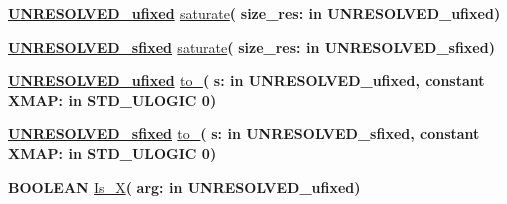 \begin{DoxyCompactItemize}
\item 
{\bfseries {\bfseries {\bfseries \hyperlink{classfixed__pkg_ae78bc2b36d22f6abeac163955e8a587d}{U\+N\+R\+E\+S\+O\+L\+V\+E\+D\+\_\+ufixed}} \textcolor{vhdlchar}{ }}} \hyperlink{classfixed__pkg_a5a4a80fca4ce1ae0ce0349f711403504}{saturate}{\bfseries  ( }{\bfseries \textcolor{vhdlchar}{size\+\_\+res\+: }\textcolor{stringliteral}{in }\textcolor{vhdlchar}{U\+N\+R\+E\+S\+O\+L\+V\+E\+D\+\_\+ufixed}}{\bfseries  )} 
\item 
{\bfseries {\bfseries {\bfseries \hyperlink{classfixed__pkg_aa723b28a027c3c0f9bca02d75e8df4d6}{U\+N\+R\+E\+S\+O\+L\+V\+E\+D\+\_\+sfixed}} \textcolor{vhdlchar}{ }}} \hyperlink{classfixed__pkg_a9fbb6432e98395eb6d27020bf82657f2}{saturate}{\bfseries  ( }{\bfseries \textcolor{vhdlchar}{size\+\_\+res\+: }\textcolor{stringliteral}{in }\textcolor{vhdlchar}{U\+N\+R\+E\+S\+O\+L\+V\+E\+D\+\_\+sfixed}}{\bfseries  )} 
\item 
{\bfseries {\bfseries {\bfseries \hyperlink{classfixed__pkg_ae78bc2b36d22f6abeac163955e8a587d}{U\+N\+R\+E\+S\+O\+L\+V\+E\+D\+\_\+ufixed}} \textcolor{vhdlchar}{ }}} \hyperlink{classfixed__pkg_a1a0ba551d5dae1edf3512dff88ca0d5d}{to\+\_}{\bfseries  ( }{\bfseries \textcolor{vhdlchar}{s\+: }\textcolor{stringliteral}{in }\textcolor{vhdlchar}{U\+N\+R\+E\+S\+O\+L\+V\+E\+D\+\_\+ufixed}}{\bfseries  , {\bfseries \textcolor{keywordflow}{constant}\textcolor{vhdlchar}{ }}\textcolor{vhdlchar}{X\+M\+A\+P\+: }\textcolor{stringliteral}{in }\textcolor{vhdlchar}{S\+T\+D\+\_\+\+U\+L\+O\+G\+I\+C   \textquotesingle{}0\textquotesingle{}}}{\bfseries  )} 
\item 
{\bfseries {\bfseries {\bfseries \hyperlink{classfixed__pkg_aa723b28a027c3c0f9bca02d75e8df4d6}{U\+N\+R\+E\+S\+O\+L\+V\+E\+D\+\_\+sfixed}} \textcolor{vhdlchar}{ }}} \hyperlink{classfixed__pkg_a54eb204a872904b05f02e464fc87b12b}{to\+\_}{\bfseries  ( }{\bfseries \textcolor{vhdlchar}{s\+: }\textcolor{stringliteral}{in }\textcolor{vhdlchar}{U\+N\+R\+E\+S\+O\+L\+V\+E\+D\+\_\+sfixed}}{\bfseries  , {\bfseries \textcolor{keywordflow}{constant}\textcolor{vhdlchar}{ }}\textcolor{vhdlchar}{X\+M\+A\+P\+: }\textcolor{stringliteral}{in }\textcolor{vhdlchar}{S\+T\+D\+\_\+\+U\+L\+O\+G\+I\+C   \textquotesingle{}0\textquotesingle{}}}{\bfseries  )} 
\item 
{\bfseries {\bfseries \textcolor{comment}{B\+O\+O\+L\+E\+A\+N}\textcolor{vhdlchar}{ }}} \hyperlink{classfixed__pkg_a636b800ea5efef42745688098f894ad9}{Is\+\_\+\+X}{\bfseries  ( }{\bfseries \textcolor{vhdlchar}{arg\+: }\textcolor{stringliteral}{in }\textcolor{vhdlchar}{U\+N\+R\+E\+S\+O\+L\+V\+E\+D\+\_\+ufixed}}{\bfseries  )} 

\end{DoxyCompactItemize}
